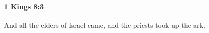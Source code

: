 
		\paragraph{1 Kings 8:3} %
			\label{1KINGS-8-3}

			And all the elders of Israel came, and the priests took up the ark.


